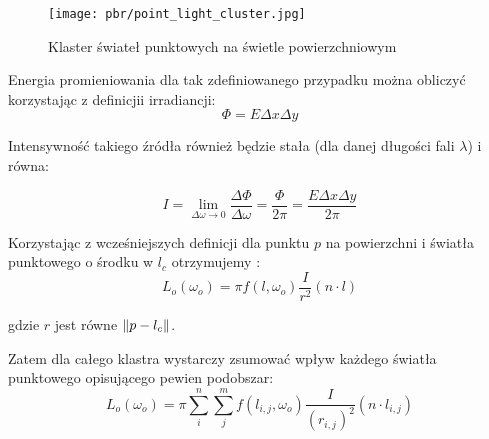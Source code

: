 \documentclass[../main.tex]{subfiles}
\begin{document}
\begin{figure}[ht]
  \centering
  \texttt{[image: pbr/point\_light\_cluster.jpg]}
  \caption{Klaster świateł punktowych na świetle powierzchniowym}
  \label{fig:PointLightCluster}
\end{figure}

Energia promieniowania dla tak zdefiniowanego przypadku można obliczyć korzystając z definicjii irradiancji:
\[
	\Phi = E \Delta{x} \Delta{y}
\]

Intensywność takiego źródła również będzie stała (dla danej długości fali $\lambda$) i równa: 

\[
  I 
	= \lim_{\Delta\omega \rightarrow 0} {
		\frac{\Delta\Phi}{\Delta\omega}
	} 
	= \frac{\Phi}{2\pi}
	= \frac{E\Delta{x}\Delta{y}}{2\pi}
\]

Korzystając z wcześniejszych definicji dla punktu $p$ na powierzchni i światła punktowego o środku w $l_c$ otrzymujemy \cite{pbr_frostbite}:
\[
	L_o(\omega_o) = \pi f(l, \omega_o) \frac{I}{r^2} (n \cdot l)
\]

\noindent gdzie $r$ jest równe $\norm{p-l_c}$.

Zatem dla całego klastra wystarczy zsumować wpływ każdego światła punktowego opisującego pewien podobszar:
\[
	L_o(\omega_o) = \pi \sum_{i}^{n} \sum_{j}^{m} {
		f(l_{i,j}, \omega_o) \frac{I}{(r_{i,j})^2} (n \cdot l_{i,j})
	}
\]
\end{document}
